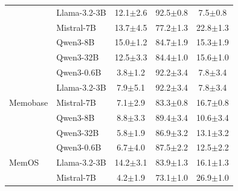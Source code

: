 \begin{table}[t]
\begin{tabular}{@{}ll ccc@{}}
  & Llama-3.2-3B   & 12.1{\scriptsize$\pm$2.6} & 92.5{\scriptsize$\pm$0.8} & 7.5{\scriptsize$\pm$0.8} \\

  & Mistral-7B     & 13.7{\scriptsize$\pm$4.5} & 77.2{\scriptsize$\pm$1.3} & 22.8{\scriptsize$\pm$1.3} \\

  & Qwen3-8B       & 15.0{\scriptsize$\pm$1.2} & 84.7{\scriptsize$\pm$1.9} & 15.3{\scriptsize$\pm$1.9} \\

  & Qwen3-32B      & 12.5{\scriptsize$\pm$3.3} & 84.4{\scriptsize$\pm$1.0} & 15.6{\scriptsize$\pm$1.0} \\
\midrule
\multirow{5}{*}{Memobase}
  & Qwen3-0.6B     & 3.8{\scriptsize$\pm$1.2} & 92.2{\scriptsize$\pm$3.4} & 7.8{\scriptsize$\pm$3.4} \\

  & Llama-3.2-3B   & 7.9{\scriptsize$\pm$5.1} & 92.2{\scriptsize$\pm$3.4} & 7.8{\scriptsize$\pm$3.4} \\

  & Mistral-7B     & 7.1{\scriptsize$\pm$2.9} & 83.3{\scriptsize$\pm$0.8} & 16.7{\scriptsize$\pm$0.8} \\

  & Qwen3-8B       & 8.8{\scriptsize$\pm$3.3} & 89.4{\scriptsize$\pm$3.4} & 10.6{\scriptsize$\pm$3.4} \\

  & Qwen3-32B      & 5.8{\scriptsize$\pm$1.9} & 86.9{\scriptsize$\pm$3.2} & 13.1{\scriptsize$\pm$3.2} \\
\midrule
\multirow{3}{*}{MemOS}
  & Qwen3-0.6B     & 6.7{\scriptsize$\pm$4.0} & 87.5{\scriptsize$\pm$2.2} & 12.5{\scriptsize$\pm$2.2} \\

  & Llama-3.2-3B   & 14.2{\scriptsize$\pm$3.1} & 83.9{\scriptsize$\pm$1.3} & 16.1{\scriptsize$\pm$1.3} \\

  & Mistral-7B     & 4.2{\scriptsize$\pm$1.9} & 73.1{\scriptsize$\pm$1.0} & 26.9{\scriptsize$\pm$1.0} \\
\bottomrule
\end{tabular}
\end{table}
